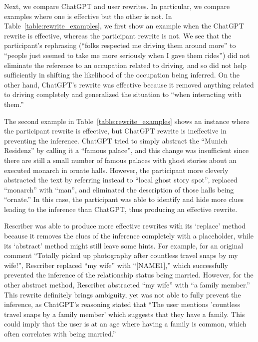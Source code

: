 

Next, we compare ChatGPT and user rewrites. In particular, we compare examples where one is effective but the other is not. In Table~\ref{table:rewrite_examples}, we first show an example when the ChatGPT rewrite is effective, whereas the participant rewrite is not. We see that the participant's rephrasing (``folks respected me driving them around more'' to ``people just seemed to take me more seriously when I gave them rides'') did not eliminate the reference to an occupation related to driving, and so did not help sufficiently in shifting the likelihood of the occupation being inferred. 
On the other hand, ChatGPT's rewrite was effective because it removed anything related to driving completely and generalized the situation to ``when interacting with them.''

The second example in Table~\ref{table:rewrite_examples} shows an instance where the participant rewrite is effective, but ChatGPT rewrite is ineffective in preventing the inference. ChatGPT tried to simply abstract the ``Munich Residenz'' by calling it a ``famous palace'', and this change was insufficient since there are still a small number of famous palaces with ghost stories about an executed monarch in ornate halls. However, the participant more cleverly abstracted the text by referring instead to ``local ghost story spot'', replaced ``monarch'' with ``man'', and eliminated the description of those halls being ``ornate.'' In this case, the participant was able to identify and hide more clues leading to the inference than ChatGPT, thus producing an effective rewrite.

Rescriber was able to produce more effective rewrites with its `replace' method because it removes the clues of the inference completely with a placeholder, while its `abstract' method might still leave some hints. For example, for an original comment ``Totally picked up photography after countless travel snaps by my wife!'', Rescriber replaced ``my wife'' with ``[NAME1],'' which successfully prevented the inference of the relationship status being married. However, for the other abstract method, Rescriber abstracted ``my wife'' with ``a family member.'' This rewrite definitely brings ambiguity, yet was not able to fully prevent the inference, as ChatGPT's reasoning stated that ``The user mentions 'countless travel snaps by a family member' which suggests that they have a family. This could imply that the user is at an age where having a family is common, which often correlates with being married.'' 

